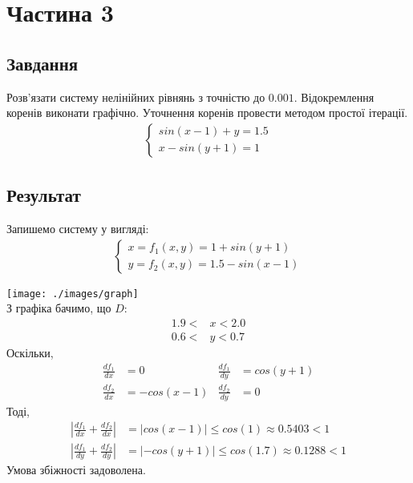 \section{Частина 3}
\label{sec:task3}

\subsection{Завдання}
\label{subsec:task3_task}

Розв'язати систему нелінійних рівнянь з точністю до $0.001$.
Відокремлення коренів виконати графічно.
Уточнення коренів провести методом простої ітерації.
\begin{align*}
    \begin{cases}
        sin(x - 1) + y = 1.5 \\
        x - sin(y + 1) = 1
    \end{cases}
\end{align*}

\subsection{Результат}
\label{subsec:task3_result}


Запишемо систему у вигляді:
\begin{align*}
    \begin{cases}
        x = f_1(x, y) = 1 + sin(y + 1) \\
        y = f_2(x, y) = 1.5 - sin(x - 1)
    \end{cases}
\end{align*}

\texttt{[image: ./images/graph]} \\

З графіка бачимо, що $D$:
\begin{align*}
    1.9 < & x < 2.0 \\
    0.6 < & y < 0.7
\end{align*}
Оскільки,
\begin{align*}
    \frac{df_1}{dx} & = 0           & \frac{df_1}{dy} & = cos(y + 1) \\
    \frac{df_2}{dx} & = -cos(x - 1) & \frac{df_2}{dy} & = 0
\end{align*}
Тоді,
\begin{align*}
    |\frac{df_1}{dx} + \frac{df_2}{dx}| & = |cos(x - 1)|  \leq cos(1)   \approx 0.5403 < 1 \\
    |\frac{df_1}{dy} + \frac{df_2}{dy}| & = |-cos(y + 1)| \leq cos(1.7) \approx 0.1288 < 1
\end{align*}
Умова збіжності задоволена.


